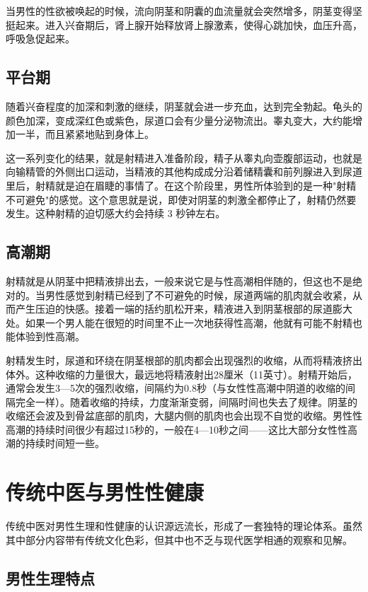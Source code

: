 \begin{enumerate}
当男性的性欲被唤起的时候，流向阴茎和阴囊的血流量就会突然增多，阴茎变得坚挺起来。进入兴奋期后，肾上腺开始释放肾上腺激素，使得心跳加快，血压升高，呼吸急促起来。

\subsection{平台期}

随着兴奋程度的加深和刺激的继续，阴茎就会进一步充血，达到完全勃起。龟头的颜色加深，变成深红色或紫色，尿道口会有少量分泌物流出。睾丸变大，大约能增加一半，而且紧紧地贴到身体上。

这一系列变化的结果，就是射精进入准备阶段，精子从睾丸向壶腹部运动，也就是向输精管的外侧出口运动，当精液的其他构成成分沿着储精囊和前列腺进入到尿道里后，射精就是迫在眉睫的事情了。在这个阶段里，男性所体验到的是一种"射精不可避免"的感觉。这个意思就是说，即使对阴茎的刺激全都停止了，射精仍然要发生。这种射精的迫切感大约会持续 3 秒钟左右。

\subsection{高潮期}

射精就是从阴茎中把精液排出去，一般来说它是与性高潮相伴随的，但这也不是绝对的。当男性感觉到射精已经到了不可避免的时候，尿道两端的肌肉就会收紧，从而产生压迫的快感。接着一端的括约肌松开来，精液进入到阴茎根部的尿道膨大处。如果一个男人能在很短的时间里不止一次地获得性高潮，他就有可能不射精也能体验到性高潮。

射精发生时，尿道和环绕在阴茎根部的肌肉都会出现强烈的收缩，从而将精液挤出体外。这种收缩的力量很大，最远地将精液射出28厘米（11英寸）。射精开始后，通常会发生3—5次的强烈收缩，间隔约为0.8秒（与女性性高潮中阴道的收缩的间隔完全一样）。随着收缩的持续，力度渐渐变弱，间隔时间也失去了规律。阴茎的收缩还会波及到骨盆底部的肌肉，大腿内侧的肌肉也会出现不自觉的收缩。男性性高潮的持续时间很少有超过15秒的，一般在4—10秒之间——这比大部分女性性高潮的持续时间短一些。

\section{传统中医与男性性健康}

传统中医对男性生理和性健康的认识源远流长，形成了一套独特的理论体系。虽然其中部分内容带有传统文化色彩，但其中也不乏与现代医学相通的观察和见解。

\subsection{男性生理特点}


\end{enumerate}
